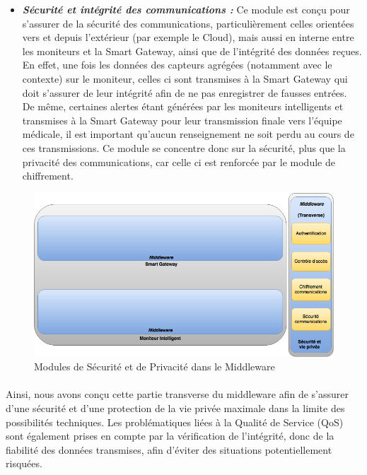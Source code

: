 \begin{itemize}
\item \textbf{\textit{Sécurité et intégrité des communications :}} Ce module est conçu pour s'assurer de la sécurité des communications, particulièrement celles orientées vers et depuis l'extérieur (par exemple le Cloud), mais aussi en interne entre les moniteurs et la Smart Gateway, ainsi que de l'intégrité des données reçues. En effet, une fois les données des capteurs agrégées (notamment avec le contexte) sur le moniteur, celles ci sont transmises à la Smart Gateway qui doit s'assurer de leur intégrité afin de ne pas enregistrer de fausses entrées. De même, certaines alertes étant générées par les moniteurs intelligents et transmises à la Smart Gateway pour leur transmission finale vers l'équipe médicale, il est important qu'aucun renseignement ne soit perdu au cours de ces transmissions. Ce module se concentre donc sur la sécurité, plus que la privacité des communications, car celle ci est renforcée par le module de chiffrement.\\
\end{itemize}
\begin{figure}[h!]
	\hspace*{-3cm}
	\centering
	\includegraphics[width=1.5\textwidth]{Figure7.png}
	\caption{Modules de Sécurité et de Privacité dans le Middleware}
	\label{secu}
\end{figure}
\paragraph{}
Ainsi, nous avons conçu cette partie transverse du middleware afin de s'assurer d'une sécurité et d'une protection de la vie
privée maximale dans la limite des possibilités techniques. Les problématiques liées à la Qualité de Service (QoS) sont également
prises en compte par la vérification de l'intégrité, donc de la fiabilité des données transmises, afin d'éviter des situations potentiellement risquées.
